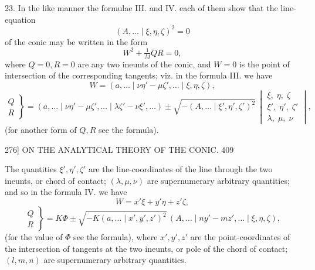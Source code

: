 \documentclass[11pt]{article}
\begin{document}
\textsc{23.} In the like manner the formulae \textsc{III.} and \textsc{IV.} each of them show that the
line-equation
\[ (A,\dots \mid \xi,\eta,\zeta)^{2}=0 \]
of the conic may be written in the form
\[ W^{2}+\tfrac{1}{M}QR=0, \]
where $Q=0,R=0$ are any two ineunts of the conic, and $W=0$ is the point of
intersection of the corresponding tangents; viz. in the formula \textsc{III.} we have
\[ W=(a,\dots \mid \nu\eta'-\mu\zeta',\dots \mid \xi,\eta,\zeta), \]
\[ \left.\begin{aligned}Q\\ R\end{aligned}\right\}=(a,\dots \mid \nu\eta'-\mu\zeta',\dots \mid \lambda\zeta'-\nu\xi',\dots)\pm\sqrt{-(A,\dots \mid \xi',\eta',\zeta')^{2}}\,
\begin{vmatrix}\xi,\;\eta,\;\zeta\\ \xi',\;\eta',\;\zeta'\\ \lambda,\;\mu,\;\nu\end{vmatrix}, \]
(for another form of $Q,R$ see the formula).

\begin{center}
\textsc{276]} \hfill ON THE ANALYTICAL THEORY OF THE CONIC. \hfill 409
\end{center}

The quantities $\xi',\eta',\zeta'$ are the line-coordinates of the line through the two
ineunts, or chord of contact; $(\lambda,\mu,\nu)$ are supernumerary arbitrary quantities; and so
in the formula \textsc{IV.} we have
\[ W = x'\xi+y'\eta+z'\zeta, \]
\[ \left.\begin{aligned}Q\\ R\end{aligned}\right\}=K\Phi\pm\sqrt{-K(a,\dots \mid x',y',z')^{2}}\,(A,\dots \mid ny'-mz',\dots \mid \xi,\eta,\zeta), \]
(for the value of $\Phi$ see the formula), where $x',y',z'$ are the point-coordinates of the
intersection of tangents at the two ineunts, or pole of the chord of contact; $(l,m,n)$
are supernumerary arbitrary quantities.
\end{document}
